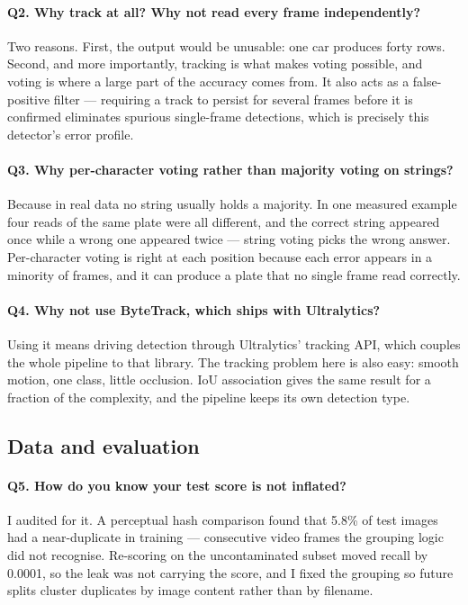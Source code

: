 \documentclass[11pt,a4paper]{article}
\begin{document}
\paragraph{Q2. Why track at all? Why not read every frame independently?}
Two reasons. First, the output would be unusable: one car produces forty rows.
Second, and more importantly, tracking is what makes voting possible, and voting
is where a large part of the accuracy comes from. It also acts as a
false-positive filter --- requiring a track to persist for several frames before
it is confirmed eliminates spurious single-frame detections, which is precisely
this detector's error profile.

\paragraph{Q3. Why per-character voting rather than majority voting on strings?}
Because in real data no string usually holds a majority. In one measured example
four reads of the same plate were all different, and the correct string appeared
once while a wrong one appeared twice --- string voting picks the wrong answer.
Per-character voting is right at each position because each error appears in a
minority of frames, and it can produce a plate that no single frame read
correctly.

\paragraph{Q4. Why not use ByteTrack, which ships with Ultralytics?}
Using it means driving detection through Ultralytics' tracking API, which couples
the whole pipeline to that library. The tracking problem here is also easy:
smooth motion, one class, little occlusion. IoU association gives the same result
for a fraction of the complexity, and the pipeline keeps its own detection type.

\subsection*{Data and evaluation}

\paragraph{Q5. How do you know your test score is not inflated?}
I audited for it. A perceptual hash comparison found that 5.8\% of test images had
a near-duplicate in training --- consecutive video frames the grouping logic did
not recognise. Re-scoring on the uncontaminated subset moved recall by 0.0001, so
the leak was not carrying the score, and I fixed the grouping so future splits
cluster duplicates by image content rather than by filename.
\end{document}
